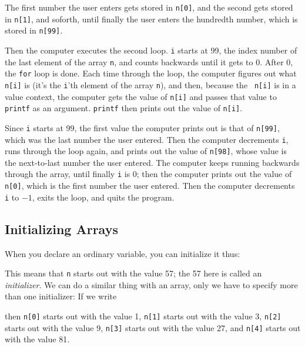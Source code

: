 The first number the user enters gets stored in {\tt n[0]}, and the
second gets stored in {\tt n[1]}, and soforth, until finally the user
enters the hundredth number, which is stored in {\tt n[99]}.  

Then the computer executes the second loop.  {\tt i} starts at 99, the
index number of the last element of the array {\tt n}, and counts
backwards until it gets to 0.  After 0, the {\tt for} loop is done. Each
time through the loop, the computer figures out what {\tt n[i]} is (it's
the {\tt i}'th element of the array {\tt n}), and then, because the {\tt
n[i]} is in a value context, the computer gets the value of {\tt n[i]}
and passes that value to {\tt printf} as an argument.  {\tt printf} then
prints out the value of {\tt n[i]}.

Since {\tt i} starts at 99, the first value the computer prints out is
that of {\tt n[99]}, which was the last number the user entered.  Then
the computer decrements {\tt i}, runs through the loop again, and prints
out the value of {\tt n[98]}, whose value is the next-to-last number the
user entered.  The computer keeps running backwards through the array,
until finally {\tt i} is 0; then the computer prints out the value of
{\tt n[0]}, which is the first number the user entered.  Then the
computer decrements {\tt i} to $-1$, exits the loop, and quits the
program.

\subsection{Initializing Arrays}

When you declare an ordinary variable, you can initialize it thus:

\begin{flushleft}
\verb% int n = 57; %
\end{flushleft}

This means that {\tt n} starts out with the value 57; the 57 here is
called an {\em initializer}.  We can do a similar thing with an array,
only we have to specify more than one initializer: If we write

\begin{flushleft}
\verb% int n[5] = { 1, 3, 9, 27, 81} ; %
\end{flushleft}

\noindent then
{\tt n[0]} starts out with the value 1,
{\tt n[1]} starts out with the value 3,
{\tt n[2]} starts out with the value 9,
{\tt n[3]} starts out with the value 27, and
{\tt n[4]} starts out with the value 81.  

